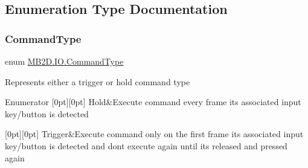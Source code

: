 \subsection{Enumeration Type Documentation}
\hypertarget{namespace_m_b2_d_1_1_i_o_ab5f95f3fe9e652778b62bdf943168a68}{}\label{namespace_m_b2_d_1_1_i_o_ab5f95f3fe9e652778b62bdf943168a68} 
\subsubsection{\texorpdfstring{Command\+Type}{CommandType}}
{\footnotesize\ttfamily enum \hyperlink{namespace_m_b2_d_1_1_i_o_ab5f95f3fe9e652778b62bdf943168a68}{M\+B2\+D.\+I\+O.\+Command\+Type}\hspace{0.3cm}{\ttfamily [strong]}}



Represents either a trigger or hold command type 

\begin{DoxyEnumFields}{Enumerator}
[0pt][0pt]{}\hypertarget{namespace_m_b2_d_1_1_i_o_ab5f95f3fe9e652778b62bdf943168a68abcd8db575b47c838e5d551e3973db4ac}{}\label{namespace_m_b2_d_1_1_i_o_ab5f95f3fe9e652778b62bdf943168a68abcd8db575b47c838e5d551e3973db4ac} 
Hold&Execute command every frame its associated input key/button is detected \\
\hline

[0pt][0pt]{}\hypertarget{namespace_m_b2_d_1_1_i_o_ab5f95f3fe9e652778b62bdf943168a68af698f67f5666aff10729d8a1cb1c14d2}{}\label{namespace_m_b2_d_1_1_i_o_ab5f95f3fe9e652778b62bdf943168a68af698f67f5666aff10729d8a1cb1c14d2} 
Trigger&Execute command only on the first frame its associated input key/button is detected and don\textquotesingle{}t execute again until it\textquotesingle{}s released and pressed again \\
\hline

\end{DoxyEnumFields}
